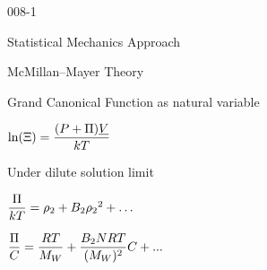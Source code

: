 \begin{mitframe}{008-1}
\begin{listone}
\begin{listtwo}
\begin{listthree}
\begin{listfour}
    			
            \end{listfour}
            
		\end{listthree}
        
	\end{listtwo}
    
	\item Statistical Mechanics Approach
    
	\begin{listtwo}
    
		\item McMillan--Mayer Theory
        
		\begin{listthree}
        
			\item Grand Canonical Function as natural variable
            
			\begin{listfour}
				
                \item $\ln(\gcpf) = \dfrac{(\p + \osmpress)\uline{\vol}}{\thermcond\Temp} $
		
                
    		\end{listfour}
            
			\item Under dilute solution limit
    			\begin{listfour}
                
				\item $\dfrac{\osmpress}{\thermcond\Temp} = \dens_{2} + \virialcoeff{2}{\dens_{2}}^2 + \hdots $
                
                
				\item $\dfrac{\osmpress}{\conc} = \dfrac{R\Temp}{\mw} + \dfrac{\virialcoeff{2}\nummoles \gasconst\Temp}{(\mw)^2}\conc + ...$


				\begin{listfive}
                

\end{listfive}
\end{listfour}
\end{listthree}
\end{listtwo}
\end{listone}
\end{mitframe}
